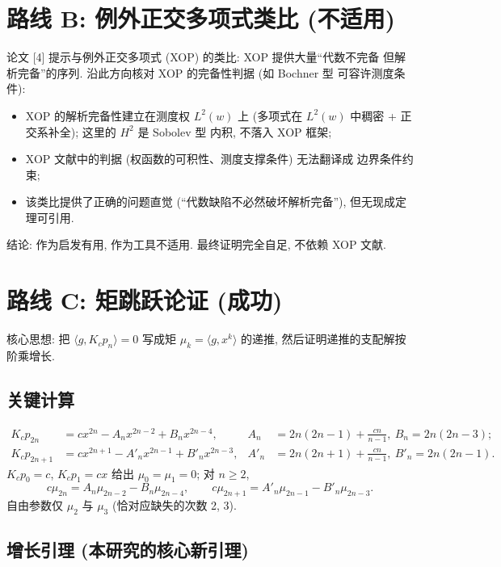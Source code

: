 \documentclass[UTF8]{ctexart}
\begin{document}
\section{路线 B: 例外正交多项式类比 (不适用)}

论文 [4] 提示与例外正交多项式 (XOP) 的类比: XOP 提供大量``代数不完备
但解析完备''的序列. 沿此方向核对 XOP 的完备性判据 (如 Bochner 型
可容许测度条件):

\begin{itemize}
	\item XOP 的解析完备性建立在测度权 $L^2(w)$ 上 (多项式在
		$L^2(w)$ 中稠密 + 正交系补全); 这里的 $H^2$ 是 Sobolev 型
		内积, 不落入 XOP 框架;
	\item XOP 文献中的判据 (权函数的可积性、测度支撑条件) 无法翻译成
		边界条件约束;
	\item 该类比提供了正确的问题直觉 (``代数缺陷不必然破坏解析完备''),
		但无现成定理可引用.
\end{itemize}
结论: 作为启发有用, 作为工具不适用. 最终证明完全自足, 不依赖 XOP 文献.

\section{路线 C: 矩跳跃论证 (成功)}

核心思想: 把 $\langle g, K_c p_n\rangle = 0$ 写成矩 $\mu_k = \langle g, x^k\rangle$
的递推, 然后证明递推的支配解按阶乘增长.

\subsection{关键计算}

\begin{align}
	K_c p_{2n} &= c x^{2n} - A_n x^{2n-2} + B_n x^{2n-4},
	& A_n &= 2n(2n-1) + \tfrac{cn}{n-1}, \ B_n = 2n(2n-3); \\
	K_c p_{2n+1} &= c x^{2n+1} - A'_n x^{2n-1} + B'_n x^{2n-3},
	& A'_n &= 2n(2n+1) + \tfrac{cn}{n-1}, \ B'_n = 2n(2n-1).
\end{align}
$K_c p_0 = c$, $K_c p_1 = cx$ 给出 $\mu_0 = \mu_1 = 0$; 对 $n \geq 2$,
\[
	c\mu_{2n} = A_n \mu_{2n-2} - B_n \mu_{2n-4}, \qquad
	c\mu_{2n+1} = A'_n \mu_{2n-1} - B'_n \mu_{2n-3}.
\]
自由参数仅 $\mu_2$ 与 $\mu_3$ (恰对应缺失的次数 2, 3).

\subsection{增长引理 (本研究的核心新引理)}
\end{document}
